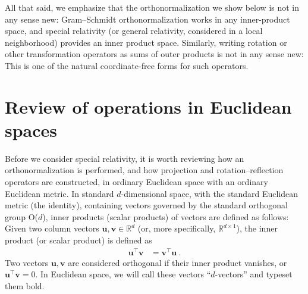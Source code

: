 \documentclass{article}
\newcommand{\Evec}[1]{{\mathbf{#1}}} %
\begin{document}
All that said, we emphasize that the orthonormalization we show below is not in any sense new:
Gram--Schmidt orthonormalization works in any inner-product space, and special relativity (or general relativity, considered in a local neighborhood) provides an inner product space.
Similarly, writing rotation or other transformation operators as sums of outer products is not in any sense new:
This is one of the natural coordinate-free forms for such operators.

\section{Review of operations in Euclidean spaces}\label{sec:od}

Before we consider special relativity, it is worth reviewing how an orthonormalization is performed, and how projection and rotation--reflection operators are constructed, in ordinary Euclidean space with an ordinary Euclidean metric.
In standard $d$-dimensional space, with the standard Euclidean metric (the identity), containing vectors governed by the standard orthogonal group O($d$), inner products (scalar products) of vectors are defined as follows:
Given two column vectors $\Evec{u},\Evec{v}\in\mathbb{R}^d$ (or, more specifically, $\mathbb{R}^{d\times1}$), the inner product (or scalar product) is defined as
\begin{align}
    \Evec{u}^\top \Evec{v} &= \Evec{v}^\top \Evec{u} ~.
\end{align}
Two vectors $\Evec{u},\Evec{v}$ are considered orthogonal if their inner product vanishes, or $\Evec{u}^\top\Evec{v}=0$.
In Euclidean space, we will call these vectors ``$d$-vectors'' and typeset them bold.
\end{document}
